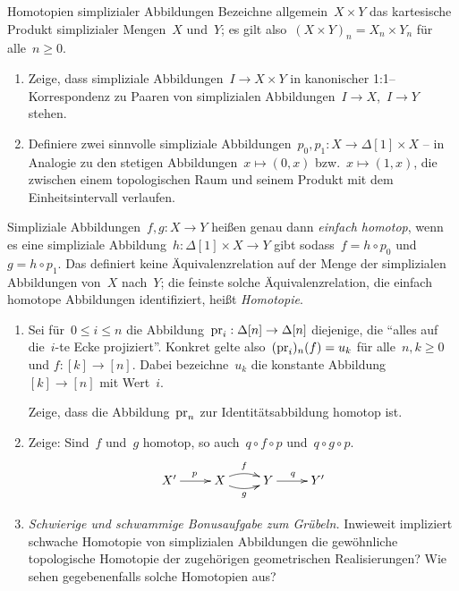 \documentclass{uebblatt}
\begin{document}
\begin{aufgabe}{Homotopien simplizialer Abbildungen}
Bezeichne allgemein~$X \times Y$ das kartesische Produkt simplizialer
Mengen~$X$ und~$Y$; es gilt also~$(X \times Y)_n = X_n \times Y_n$ für alle~$n
\geq 0$.

\begin{enumerate}
\item Zeige, dass simpliziale Abbildungen~$I \to X \times Y$ in kanonischer
1:1--Korrespondenz zu Paaren von simplizialen Abbildungen~$I \to X$,~$I \to Y$
stehen.
\item Definiere zwei sinnvolle simpliziale Abbildungen~$p_0, p_1 : X \to
\Delta[1] \times X$ -- in Analogie zu den stetigen Abbildungen~$x \mapsto
(0,x)$ bzw.~$x \mapsto (1,x)$, die zwischen einem topologischen Raum und seinem
Produkt mit dem Einheitsintervall verlaufen.
\end{enumerate}
Simpliziale Abbildungen~$f,g : X \to Y$ heißen genau dann \emph{einfach
homotop}, wenn es eine simpliziale Abbildung~$h : \Delta[1] \times X \to Y$
gibt sodass~$f = h \circ p_0$ und~$g = h \circ p_1$. Das definiert keine
Äquivalenzrelation auf der Menge der simplizialen Abbildungen von~$X$ nach~$Y$;
die feinste solche Äquivalenzrelation, die einfach homotope Abbildungen
identifiziert, heißt \emph{Homotopie}.
\begin{enumerate}
\addtocounter{enumi}{2}
\item Sei für~$0 \leq i \leq n$ die Abbildung~$\mathrm{pr}_i : \Delta[n] \to \Delta[n]$
diejenige, die ``alles auf die~$i$-te Ecke projiziert''. Konkret gelte
also~$(\mathrm{pr}_i)_n(f) = u_k$ für alle~$n,k \geq 0$ und $f : [k] \to [n]$. Dabei
bezeichne~$u_k$ die konstante Abbildung~$[k] \to [n]$ mit Wert~$i$.

Zeige, dass die Abbildung~$\mathrm{pr}_n$ zur Identitätsabbildung homotop ist.

\item Zeige: Sind~$f$ und~$g$ homotop, so
auch~$q \circ f \circ p$ und~$q \circ g \circ p$.
\[ \xymatrix{
  X' \ar[r]^p & X \ar@/^/[r]^f \ar@/_/[r]_g & Y \ar[r]^q & Y'
} \]

\item \emph{Schwierige und schwammige Bonusaufgabe zum Grübeln.} Inwieweit
impliziert schwache Homotopie von simplizialen Abbildungen die gewöhnliche
topologische Homotopie der zugehörigen geometrischen Realisierungen? Wie sehen
gegebenenfalls solche Homotopien aus?
\end{enumerate}
\end{aufgabe}
\end{document}
